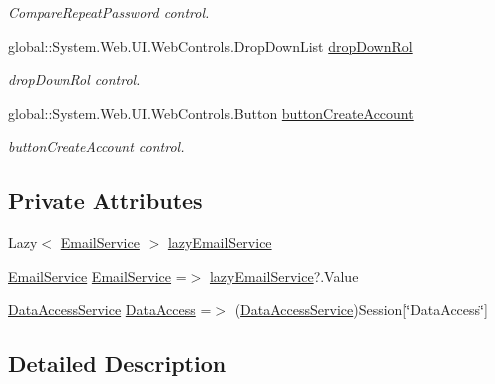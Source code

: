 \begin{DoxyCompactItemize}
\begin{DoxyCompactList}\small\item\em Compare\+Repeat\+Password control. \end{DoxyCompactList}\item 
global\+::\+System.\+Web.\+U\+I.\+Web\+Controls.\+Drop\+Down\+List \mbox{\hyperlink{classWebApplication_1_1Registro_a225d72ba4515f5fd01dc179e37ab2917}{drop\+Down\+Rol}}
\begin{DoxyCompactList}\small\item\em drop\+Down\+Rol control. \end{DoxyCompactList}\item 
global\+::\+System.\+Web.\+U\+I.\+Web\+Controls.\+Button \mbox{\hyperlink{classWebApplication_1_1Registro_a4ea48eccdd4cc7019bb93236cec4102f}{button\+Create\+Account}}
\begin{DoxyCompactList}\small\item\em button\+Create\+Account control. \end{DoxyCompactList}\end{DoxyCompactItemize}
\subsection*{Private Attributes}
\begin{DoxyCompactItemize}
\item 
Lazy$<$ \mbox{\hyperlink{classEmailLib_1_1EmailService}{Email\+Service}} $>$ \mbox{\hyperlink{classWebApplication_1_1Registro_ab3596ca6d4c68364d6e109b9536b210a}{lazy\+Email\+Service}}
\item 
\mbox{\hyperlink{classEmailLib_1_1EmailService}{Email\+Service}} \mbox{\hyperlink{classWebApplication_1_1Registro_ab1c51ef2d472d1dd5d0118c1202fe320}{Email\+Service}} =$>$ \mbox{\hyperlink{classWebApplication_1_1Registro_ab3596ca6d4c68364d6e109b9536b210a}{lazy\+Email\+Service}}?.Value
\item 
\mbox{\hyperlink{classDataBaseAccess_1_1DataAccessService}{Data\+Access\+Service}} \mbox{\hyperlink{classWebApplication_1_1Registro_ae06e320e4cdfb04c4f2cdf542f13ef86}{Data\+Access}} =$>$ (\mbox{\hyperlink{classDataBaseAccess_1_1DataAccessService}{Data\+Access\+Service}})Session\mbox{[}\char`\"{}Data\+Access\char`\"{}\mbox{]}
\end{DoxyCompactItemize}


\subsection{Detailed Description}


